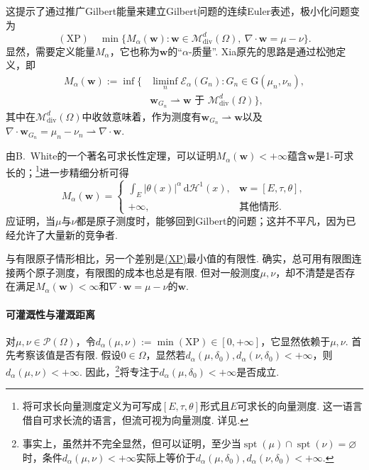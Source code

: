 这提示了通过推广Gilbert能量来建立Gilbert问题的连续Euler表述，极小化问题变为
\begin{equation}\label{eq:4.32}
 (\mathrm{XP})\quad
 \min\{M_\alpha(\mathbf w):\mathbf w\in\mathscr M^d_{\mathrm{div}}(\Omega),
                                \ \nabla\cdot\mathbf w=\mu-\nu\}.
\end{equation}
\label{idx:root4-p165-relaxation}显然，需要定义能量$M_\alpha$，它也称为$\mathbf w$的“$\alpha$-质量”. Xia原先的思路是通过松弛定义，即
\begin{equation*}
\begin{aligned}
 M_\alpha(\mathbf w):=\inf\bigl\{&\liminf_n\mathscr E_\alpha(G_n):
                  G_n\in\mathrm G(\mu_n,\nu_n),\\
            &\mathbf w_{G_n}\rightharpoonup\mathbf w
                     \text{ 于 }\mathscr M^d_{\mathrm{div}}(\Omega)\bigr\},
\end{aligned}
\end{equation*}
其中在$\mathscr M^d_{\mathrm{div}}(\Omega)$中收敛意味着，作为测度有$\mathbf w_{G_n}\rightharpoonup\mathbf w$以及$\nabla\cdot\mathbf w_{G_n}=\mu_n-\nu_n\rightharpoonup\nabla\cdot\mathbf w$.

\label{idx:root4-p166-rectifiability}由B.~White的一个著名可求长性定理\cite{b296}，可以证明$M_\alpha(\mathbf w)<+\infty$蕴含$\mathbf w$是1-可求长的；\footnote{将可求长向量测度定义为可写成$[E,\tau,\theta]$形式且$E$可求长的向量测度. 这一语言借自可求长流的语言，但流可视为向量测度. 详见\cite{b161}.}进一步精细分析可得
\[
 M_\alpha(\mathbf w)=\begin{cases}
 \displaystyle\int_E|\theta(x)|^\alpha\,\mathrm d\mathscr H^1(x),
                   &\mathbf w=[E,\tau,\theta],\\
 +\infty,&\text{其他情形}.
 \end{cases}
\]
应证明，当$\mu$与$\nu$都是原子测度时，能够回到Gilbert的问题；这并不平凡，因为已经允许了大量新的竞争者.

与有限原子情形相比，另一个差别是\hyperref[eq:4.32]{(XP)}最小值的有限性. 确实，总可用有限图连接两个原子测度，有限图的成本也总是有限. 但对一般测度$\mu,\nu$，却不清楚是否存在满足$M_\alpha(\mathbf w)<\infty$和$\nabla\cdot\mathbf w=\mu-\nu$的$\mathbf w$.

\paragraph{可灌溉性与灌溉距离}
\label{idx:root4-p166-irrigation-distance}对$\mu,\nu\in\mathscr P(\Omega)$，令$d_\alpha(\mu,\nu):=\min(\mathrm{XP})\in[0,+\infty]$，它显然依赖于$\mu,\nu$. 首先考察该值是否有限. 假设$0\in\Omega$，显然若$d_\alpha(\mu,\delta_0),d_\alpha(\nu,\delta_0)<+\infty$，则$d_\alpha(\mu,\nu)<+\infty$. 因此，\footnote{事实上，虽然并不完全显然，但可以证明，至少当$\operatorname{spt}(\mu)\cap\operatorname{spt}(\nu)=\varnothing$时，条件$d_\alpha(\mu,\nu)<+\infty$实际上等价于$d_\alpha(\mu,\delta_0),d_\alpha(\nu,\delta_0)<+\infty$.}将专注于$d_\alpha(\mu,\delta_0)<+\infty$是否成立.

